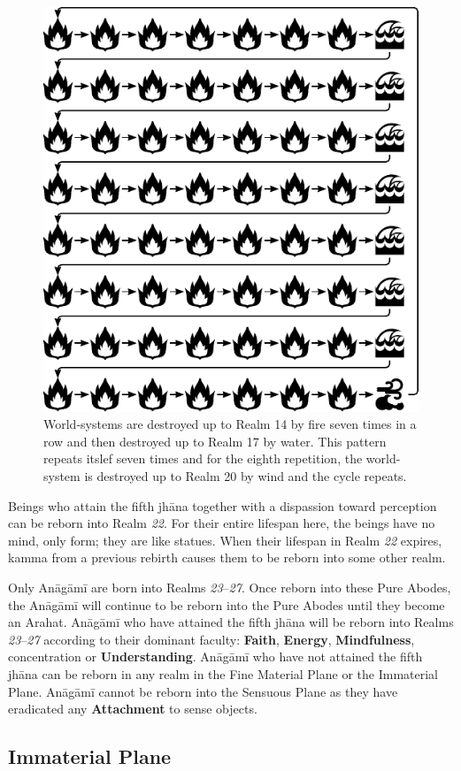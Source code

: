 \begin{figure}[h]
\centering
\includegraphics[width=0.7\linewidth]{./Diagrams/Worlds}
\caption{World-systems are destroyed up to Realm 14 by fire seven times in a row and then destroyed up to Realm 17 by water. This pattern repeats itslef seven times and for the eighth repetition, the world-system is destroyed up to Realm 20 by wind and the cycle repeats.}
\label{fig:Worlds}
\end{figure}

Beings who attain the fifth jhāna together with a dispassion toward perception can be reborn into Realm \textit{22}. For their entire lifespan here, the beings have no mind, only form; they are like statues. When their lifespan in Realm \textit{22} expires, kamma from a previous rebirth causes them to be reborn into some other realm.

Only Anāgāmī are born into Realms \textit{23}--\textit{27}. Once reborn into these Pure Abodes, the Anāgāmī will continue to be reborn into the Pure Abodes until they become an Arahat. Anāgāmī who have attained the fifth jhāna will be reborn into Realms \textit{23}--\textit{27} according to their dominant faculty: \textbf{Faith}, \textbf{Energy}, \textbf{Mindfulness}, concentration or \textbf{Understanding}. Anāgāmī who have not attained the fifth jhāna can be reborn in any realm in the Fine Material Plane or the Immaterial Plane. Anāgāmī cannot be reborn into the Sensuous Plane as they have eradicated any \textbf{Attachment} to sense objects.

\subsection*{Immaterial Plane}

